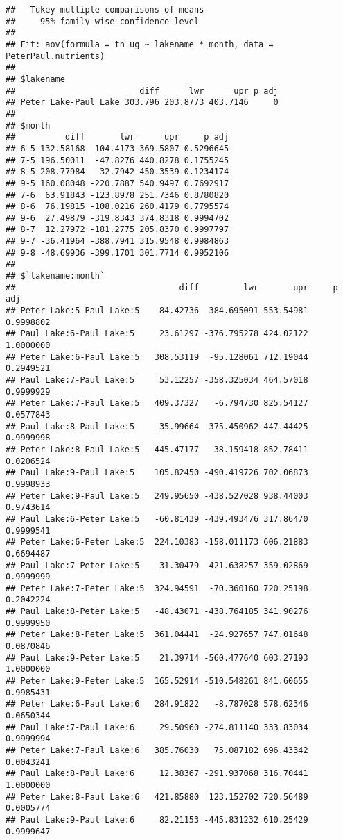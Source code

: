 \documentclass[
]{article}
\begin{document}
\begin{verbatim}
##   Tukey multiple comparisons of means
##     95% family-wise confidence level
## 
## Fit: aov(formula = tn_ug ~ lakename * month, data = PeterPaul.nutrients)
## 
## $lakename
##                         diff      lwr      upr p adj
## Peter Lake-Paul Lake 303.796 203.8773 403.7146     0
## 
## $month
##          diff       lwr      upr     p adj
## 6-5 132.58168 -104.4173 369.5807 0.5296645
## 7-5 196.50011  -47.8276 440.8278 0.1755245
## 8-5 208.77984  -32.7942 450.3539 0.1234174
## 9-5 160.08048 -220.7887 540.9497 0.7692917
## 7-6  63.91843 -123.8978 251.7346 0.8780820
## 8-6  76.19815 -108.0216 260.4179 0.7795574
## 9-6  27.49879 -319.8343 374.8318 0.9994702
## 8-7  12.27972 -181.2775 205.8370 0.9997797
## 9-7 -36.41964 -388.7941 315.9548 0.9984863
## 9-8 -48.69936 -399.1701 301.7714 0.9952106
## 
## $`lakename:month`
##                                 diff         lwr       upr     p adj
## Peter Lake:5-Paul Lake:5    84.42736 -384.695091 553.54981 0.9998802
## Paul Lake:6-Paul Lake:5     23.61297 -376.795278 424.02122 1.0000000
## Peter Lake:6-Paul Lake:5   308.53119  -95.128061 712.19044 0.2949521
## Paul Lake:7-Paul Lake:5     53.12257 -358.325034 464.57018 0.9999929
## Peter Lake:7-Paul Lake:5   409.37327   -6.794730 825.54127 0.0577843
## Paul Lake:8-Paul Lake:5     35.99664 -375.450962 447.44425 0.9999998
## Peter Lake:8-Paul Lake:5   445.47177   38.159418 852.78411 0.0206524
## Paul Lake:9-Paul Lake:5    105.82450 -490.419726 702.06873 0.9998933
## Peter Lake:9-Paul Lake:5   249.95650 -438.527028 938.44003 0.9743614
## Paul Lake:6-Peter Lake:5   -60.81439 -439.493476 317.86470 0.9999541
## Peter Lake:6-Peter Lake:5  224.10383 -158.011173 606.21883 0.6694487
## Paul Lake:7-Peter Lake:5   -31.30479 -421.638257 359.02869 0.9999999
## Peter Lake:7-Peter Lake:5  324.94591  -70.360160 720.25198 0.2042224
## Paul Lake:8-Peter Lake:5   -48.43071 -438.764185 341.90276 0.9999950
## Peter Lake:8-Peter Lake:5  361.04441  -24.927657 747.01648 0.0870846
## Paul Lake:9-Peter Lake:5    21.39714 -560.477640 603.27193 1.0000000
## Peter Lake:9-Peter Lake:5  165.52914 -510.548261 841.60655 0.9985431
## Peter Lake:6-Paul Lake:6   284.91822   -8.787028 578.62346 0.0650344
## Paul Lake:7-Paul Lake:6     29.50960 -274.811140 333.83034 0.9999994
## Peter Lake:7-Paul Lake:6   385.76030   75.087182 696.43342 0.0043241
## Paul Lake:8-Paul Lake:6     12.38367 -291.937068 316.70441 1.0000000
## Peter Lake:8-Paul Lake:6   421.85880  123.152702 720.56489 0.0005774
## Paul Lake:9-Paul Lake:6     82.21153 -445.831232 610.25429 0.9999647

\end{verbatim}
\end{document}

